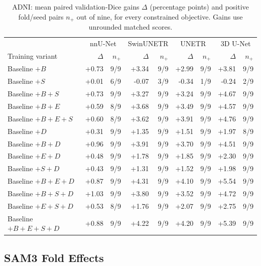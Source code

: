 \documentclass[12pt,a4paper]{article}
\begin{document}
\begin{table}[htbp]
\centering\small{}
\setlength{\tabcolsep}{4pt}
\renewcommand{\arraystretch}{1.12}
\begin{tabular}{@{}l*{4}{rr}@{}}
\hline
 & \multicolumn{2}{c}{nnU-Net} & \multicolumn{2}{c}{SwinUNETR} & \multicolumn{2}{c}{UNETR} & \multicolumn{2}{c}{3D U-Net} \\
Training variant & $\Delta$ & $n_+$ & $\Delta$ & $n_+$ & $\Delta$ & $n_+$ & $\Delta$ & $n_+$ \\
\hline
Baseline $+B$ & +0.73 & 9/9 & +3.34 & 9/9 & +2.99 & 9/9 & +3.81 & 9/9 \\
Baseline $+S$ & +0.01 & 6/9 & -0.07 & 3/9 & -0.34 & 1/9 & -0.24 & 2/9 \\
Baseline $+B+S$ & +0.73 & 9/9 & +3.27 & 9/9 & +3.24 & 9/9 & +4.67 & 9/9 \\
Baseline $+B+E$ & +0.59 & 8/9 & +3.68 & 9/9 & +3.49 & 9/9 & +4.57 & 9/9 \\
Baseline $+B+E+S$ & +0.60 & 8/9 & +3.62 & 9/9 & +3.91 & 9/9 & +4.76 & 9/9 \\
Baseline $+D$ & +0.31 & 9/9 & +1.35 & 9/9 & +1.51 & 9/9 & +1.97 & 8/9 \\
Baseline $+B+D$ & +0.96 & 9/9 & +3.91 & 9/9 & +3.70 & 9/9 & +4.51 & 9/9 \\
Baseline $+E+D$ & +0.48 & 9/9 & +1.78 & 9/9 & +1.85 & 9/9 & +2.30 & 9/9 \\
Baseline $+S+D$ & +0.43 & 9/9 & +1.31 & 9/9 & +1.52 & 9/9 & +1.98 & 9/9 \\
Baseline $+B+E+D$ & +0.87 & 9/9 & +4.31 & 9/9 & +4.10 & 9/9 & +5.54 & 9/9 \\
Baseline $+B+S+D$ & +1.03 & 9/9 & +3.80 & 9/9 & +3.52 & 9/9 & +4.72 & 9/9 \\
Baseline $+E+S+D$ & +0.53 & 8/9 & +1.76 & 9/9 & +2.07 & 9/9 & +2.75 & 9/9 \\
Baseline $+B+E+S+D$ & +0.88 & 9/9 & +4.22 & 9/9 & +4.20 & 9/9 & +5.39 & 9/9 \\
\hline
\end{tabular}
\caption{ADNI: mean paired validation-Dice gains $\Delta$
(percentage points) and positive fold/seed pairs $n_+$ out of nine,
for every constrained objective. Gains use unrounded matched scores.}
\label{tab:adni-noaug-ledger}
\end{table}

\FloatBarrier

\subsection{SAM3 Fold Effects}
\end{document}
